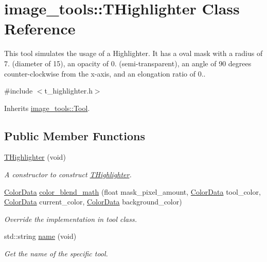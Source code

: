 \hypertarget{classimage__tools_1_1THighlighter}{}\section{image\+\_\+tools\+:\+:T\+Highlighter Class Reference}
\label{classimage__tools_1_1THighlighter}


This tool simulates the usage of a Highlighter. It has a oval mask with a radius of 7. (diameter of 15), an opacity of 0. (semi-\/transparent), an angle of 90 degrees counter-\/clockwise from the x-\/axis, and an elongation ratio of 0..  




{\ttfamily \#include $<$t\+\_\+highlighter.\+h$>$}



Inherits \hyperlink{classimage__tools_1_1Tool}{image\+\_\+tools\+::\+Tool}.

\subsection*{Public Member Functions}
\begin{DoxyCompactItemize}
\item 
\hyperlink{classimage__tools_1_1THighlighter_a7304032f6e84685d0389da4b471b5925}{T\+Highlighter} (void)\hypertarget{classimage__tools_1_1THighlighter_a7304032f6e84685d0389da4b471b5925}{}\label{classimage__tools_1_1THighlighter_a7304032f6e84685d0389da4b471b5925}

\begin{DoxyCompactList}\small\item\em A constructor to construct \hyperlink{classimage__tools_1_1THighlighter}{T\+Highlighter}. \end{DoxyCompactList}\item 
\hyperlink{classimage__tools_1_1ColorData}{Color\+Data} \hyperlink{classimage__tools_1_1THighlighter_a79d79961c53317fe6e6ec8fd23fdbff4}{color\+\_\+blend\+\_\+math} (float mask\+\_\+pixel\+\_\+amount, \hyperlink{classimage__tools_1_1ColorData}{Color\+Data} tool\+\_\+color, \hyperlink{classimage__tools_1_1ColorData}{Color\+Data} current\+\_\+color, \hyperlink{classimage__tools_1_1ColorData}{Color\+Data} background\+\_\+color)\hypertarget{classimage__tools_1_1THighlighter_a79d79961c53317fe6e6ec8fd23fdbff4}{}\label{classimage__tools_1_1THighlighter_a79d79961c53317fe6e6ec8fd23fdbff4}

\begin{DoxyCompactList}\small\item\em Override the implementation in tool class. \end{DoxyCompactList}\item 
std\+::string \hyperlink{classimage__tools_1_1THighlighter_a741f3c465603450d443f7445ec87c670}{name} (void)
\begin{DoxyCompactList}\small\item\em Get the name of the specific tool. \end{DoxyCompactList}\end{DoxyCompactItemize}
